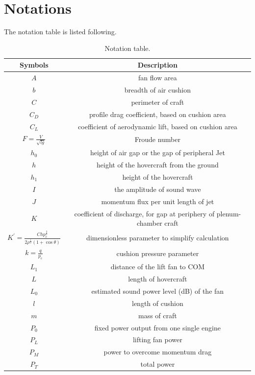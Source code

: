 \section{Notations}
The notation table is listed following.
\begin{table}

\caption{\label{Notation Table}Notation table.}
\begin{ruledtabular}
\begin{tabular}{cc}
\textbf{Symbols} & \textbf{Description}\\
\toprule

$A$ & fan flow area \\
$b$ & breadth of air cushion \\
$C$ & perimeter of craft\\
$C_D$ & profile drag coefficient, based on cushion area \\
$C_L$ & coefficient of aerodynamic lift, based on cushion area \\
$F = \frac{V}{\sqrt{lg}}$ & Froude number \\
$h_0$ &  height of air gap or the gap of peripheral Jet
 \\
$h $ &  height of the hovercraft from the ground  \\
$h_1$ &  height of the hovercraft \\
$I$ & the amplitude of sound wave \\
$J$ & momentum flux per unit length of jet \\
$K$ & coefficient of discharge, for gap at periphery of plenum-chamber craft \\
$K^{'}=\frac{Chp^{\frac{3}{2}}_{c}}{2\rho^{\frac{1}{2}}(1+\cos{\theta})}$ &  dimensionless parameter to simplify calculation\\
$k = \frac{q}{p_c}$ & cushion pressure parameter \\
$L_1$ & distance of the lift fan to COM \\
$L$ & length of hovercraft \\
$L_0$ & estimated sound power level (dB) of
the fan \\
$l$ & length of cushion\\
$m$ & mass of craft \\
$P_0$ & fixed power output from one single engine \\
$P_L$ & lifting fan power \\
$P_M$ & power to overcome momentum drag \\
$P_T$ & total power \\

\end{tabular}
\end{ruledtabular}
\end{table}
